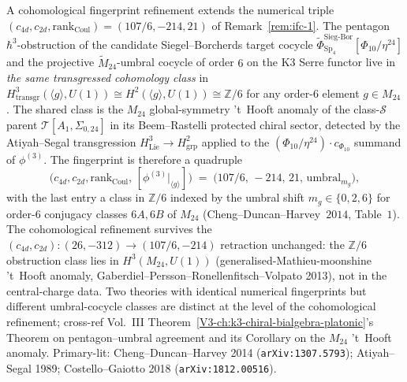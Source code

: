 \begin{remark}
\label{rem:ifc-3-pentagon-umbral}
A cohomological fingerprint refinement extends the numerical triple
$(c_{4d}, c_{2d}, \mathrm{rank}_{\mathrm{Coul}}) = (107/6, -214, 21)$
of Remark~\ref{rem:ifc-1}. The pentagon
$\hbar^3$-obstruction of the candidate Siegel--Borcherds target cocycle
$\widetilde{\Phi}^{\mathrm{Sieg\text{-}Bor}}_{\mathrm{Sp}_4}[\Phi_{10}/\eta^{24}]$
and the projective $\widetilde{M}_{24}$-umbral cocycle of order $6$ on the
K3 Serre functor live in \emph{the same transgressed cohomology class}
in $H^3_{\mathrm{transgr}}(\langle g\rangle, U(1)) \cong H^2(\langle
g\rangle, U(1)) \cong \mathbb{Z}/6$ for any order-$6$ element
$g\in M_{24}$. The shared class is the $M_{24}$ global-symmetry 't~Hooft
anomaly of the class-$\mathcal S$ parent $\mathcal T[A_1,\Sigma_{0,24}]$
in its Beem--Rastelli protected chiral sector, detected by the
Atiyah--Segal transgression $H^3_{\mathrm{Lie}}\to H^2_{\mathrm{grp}}$
applied to the $(\Phi_{10}/\eta^{24})\cdot c_{\Phi_{10}}$ summand of
$\phi^{(3)}$. The fingerprint is therefore a quadruple
\[
 \bigl(c_{4d}, c_{2d}, \mathrm{rank}_{\mathrm{Coul}},\,
 [\phi^{(3)}|_{\langle g\rangle}]\bigr)
 \;=\;
 \bigl(107/6,\, -214,\, 21,\, \mathrm{umbral}_{m_g}\bigr),
\]
with the last entry a class in $\mathbb{Z}/6$ indexed by the umbral shift
$m_g\in\{0,2,6\}$ for order-$6$ conjugacy classes $6A, 6B$ of $M_{24}$
(Cheng--Duncan--Harvey~$2014$, Table~$1$). The cohomological refinement
survives the $(c_{4d}, c_{2d}): (26, -312) \to (107/6, -214)$
retraction unchanged: the $\mathbb{Z}/6$ obstruction class lies in
$H^3(M_{24}, U(1))$ (generalised-Mathieu-moonshine 't~Hooft
anomaly, Gaberdiel--Persson--Ronellenfitsch--Volpato 2013), not
in the central-charge data. Two theories with
identical numerical fingerprints but different umbral-cocycle classes
are distinct at the level of the cohomological refinement; cross-ref
Vol.~III Theorem~\ref{V3-ch:k3-chiral-bialgebra-platonic}'s
Theorem on pentagon--umbral agreement and its Corollary on the $M_{24}$
't~Hooft anomaly. Primary-lit: Cheng--Duncan--Harvey 2014
(\texttt{arXiv:1307.5793}); Atiyah--Segal 1989; Costello--Gaiotto 2018
(\texttt{arXiv:1812.00516}).
\end{remark}
